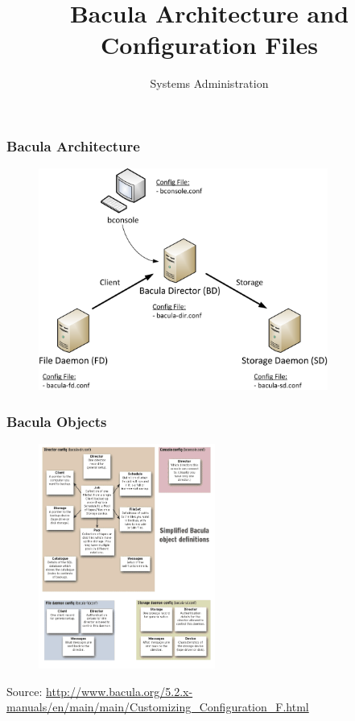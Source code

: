 \documentclass[10pt]{beamer}
\title{Bacula Architecture and Configuration Files}
\author[IN719]{Systems Administration}
\institute[Otago Polytechnic]{
  Otago Polytechnic \\
  Dunedin, New Zealand \\
}
\date{}
\begin{document}
\begin{frame}[plain]
  \titlepage
\end{frame}

\begin{frame}
  \frametitle{Bacula Architecture}
 
\begin{figure}
\includegraphics[width=9.5cm]{./figures/BaculaSchema.png}
\end{figure}

\end{frame}

\begin{frame}
  \frametitle{Bacula Objects}

\begin{figure}
\includegraphics[width=5.8cm]{./figures/bacula-objects.png}
\end{figure}

\vspace{-0.5cm}
{\scriptsize Source:  \url{http://www.bacula.org/5.2.x-manuals/en/main/main/Customizing_Configuration_F.html}}

\end{frame}
\end{document}
